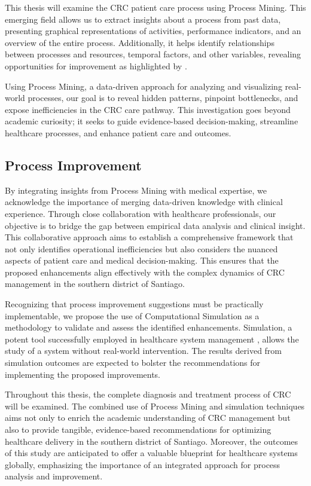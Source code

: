 This thesis will examine the CRC patient care process using Process Mining. This emerging field allows us to extract insights about a process from past data, presenting graphical representations of activities, performance indicators, and an overview of the entire process. Additionally, it helps identify relationships between processes and resources, temporal factors, and other variables, revealing opportunities for improvement as highlighted by .

Using Process Mining, a data-driven approach for analyzing and visualizing real-world processes, our goal is to reveal hidden patterns, pinpoint bottlenecks, and expose inefficiencies in the CRC care pathway. This investigation goes beyond academic curiosity; it seeks to guide evidence-based decision-making, streamline healthcare processes, and enhance patient care and outcomes.

\subsection*{Process Improvement}

By integrating insights from Process Mining with medical expertise, we acknowledge the importance of merging data-driven knowledge with clinical experience. Through close collaboration with healthcare professionals, our objective is to bridge the gap between empirical data analysis and clinical insight. This collaborative approach aims to establish a comprehensive framework that not only identifies operational inefficiencies but also considers the nuanced aspects of patient care and medical decision-making. This ensures that the proposed enhancements align effectively with the complex dynamics of CRC management in the southern district of Santiago.

Recognizing that process improvement suggestions must be practically implementable, we propose the use of Computational Simulation as a methodology to validate and assess the identified enhancements. Simulation, a potent tool successfully employed in healthcare system management \cite{zhang_application_2018}, allows the study of a system without real-world intervention. The results derived from simulation outcomes are expected to bolster the recommendations for implementing the proposed improvements.

Throughout this thesis, the complete diagnosis and treatment process of CRC will be examined. The combined use of Process Mining and simulation techniques aims not only to enrich the academic understanding of CRC management but also to provide tangible, evidence-based recommendations for optimizing healthcare delivery in the southern district of Santiago. Moreover, the outcomes of this study are anticipated to offer a valuable blueprint for healthcare systems globally, emphasizing the importance of an integrated approach for process analysis and improvement.


